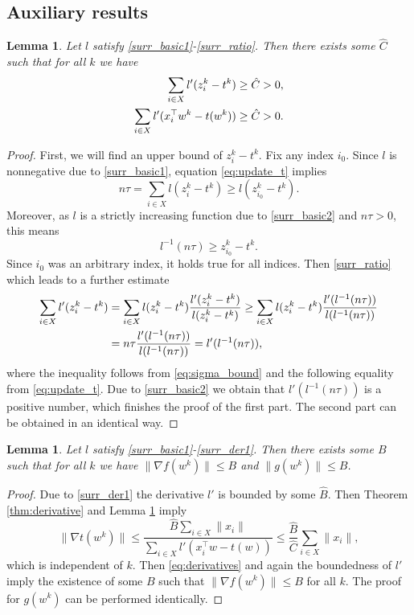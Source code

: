 \documentclass[]{interact}
\theoremstyle{plain}%
\newtheorem{lemma}[theorem]{Lemma}
\theoremstyle{definition}
\theoremstyle{remark}
\newcommand{\norm}[1]{\|#1\|}
\begin{document}
\subsection{Auxiliary results}\label{app:sgd3}

\begin{lemma}\label{lemma:bound_zero}
Let $l$ satisfy \ref{surr_basic1}-\ref{surr_ratio}. Then there exists some $\hat C$ such that for all $k$ we have
$$
\aligned
\sum_{i\in X}l'(z_i^k-t^k) &\ge \hat C > 0, \\
\sum_{i\in X}l'(x_i^\top w^k-t(w^k)) &\ge \hat C > 0.
\endaligned
$$
\end{lemma}
\begin{proof}
First, we will find an upper bound of $z_i^k-t^k$. Fix any index $i_0$. Since $l$ is nonnegative due to \ref{surr_basic1}, equation \eqref{eq:update_t} implies
$$
n\tau=\sum_{i\in X}l(z_i^k-t^k) \ge l(z_{i_0}^k-t^k).
$$
Moreover, as $l$ is a strictly increasing function due to \ref{surr_basic2} and $n\tau>0$, this means 
\begin{equation}\label{eq:sigma_bound}
l^{-1}(n\tau) \ge z_{i_0}^k-t^k.
\end{equation}
Since $i_0$ was an arbitrary index, it holds true for all indices. Then \ref{surr_ratio} which leads to a further estimate
$$
\aligned
\sum_{i\in X}l'(z_i^k-t^k) &= \sum_{i\in X} l(z_i^k-t^k)\frac{l'(z_i^k-t^k)}{l(z_i^k-t^k)} \ge \sum_{i\in X} l(z_i^k-t^k)\frac{l'(l^{-1}(n\tau))}{l(l^{-1}(n\tau))} \\
&= n\tau\frac{l'(l^{-1}(n\tau))}{l(l^{-1}(n\tau))} = l'(l^{-1}(n\tau)),
\endaligned
$$
where the inequality follows from \eqref{eq:sigma_bound} and the following equality from \eqref{eq:update_t}. Due to \ref{surr_basic2} we obtain that $l'(l^{-1}(n\tau))$ is a positive number, which finishes the proof of the first part. The second part can be obtained in an identical way.
\end{proof}


\begin{lemma}\label{lemma:bound_g}
Let $l$ satisfy \ref{surr_basic1}-\ref{surr_der1}. Then there exists some $B$ such that for all $k$ we have $\norm{\nabla f(w^k)}\le B$ and $\norm{g(w^k)}\le B$.
\end{lemma}
\begin{proof}
Due to \ref{surr_der1} the derivative $l'$ is bounded by some $\hat B$. Then Theorem \ref{thm:derivative} and Lemma \ref{lemma:bound_zero} imply
$$
\norm{\nabla t(w^k)} \le \frac{\hat B\sum_{i\in X}\norm{x_i}
}{\sum_{i\in X}l'(x_i^\top w-t(w))} \le \frac{\hat B}{\hat C}\sum_{i\in X}\norm{x_i},
$$
which is independent of $k$. Then \eqref{eq:derivatives} and again the boundedness of $l'$ imply the existence of some $B$ such that $\norm{\nabla f(w^k)}\le B$ for all $k$. The proof for $g(w^k)$ can be performed identically.
\end{proof}
\end{document}
